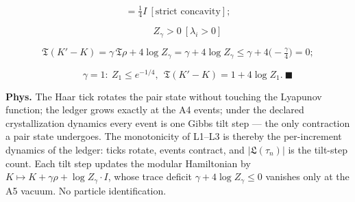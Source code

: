 \begin{corollary}
\[
= \tfrac14I\ [\text{strict concavity}];
\]

\[
\qquad Z_\gamma>0\ [\lambda_i>0]
\]

\[
\mathfrak T(K'-K)=\gamma\,\mathfrak T\rho+4\log Z_\gamma=\gamma+4\log Z_\gamma\le\gamma+4\bigl(-\tfrac\gamma4\bigr)=0;
\]

\[
\qquad \gamma=1:\ Z_1\le e^{-1/4},\ \ \mathfrak T(K'-K)=1+4\log Z_1.\ \blacksquare
\]

\textbf{Phys.} The Haar tick rotates the pair state without touching the Lyapunov function; the ledger grows exactly at the A4 events; under the declared crystallization dynamics every event is one Gibbs tilt step — the only contraction a pair state undergoes. The monotonicity of L1–L3 is thereby the per-increment dynamics of the ledger: ticks rotate, events contract, and $|\mathfrak L(\tau_n)|$ is the tilt-step count. Each tilt step updates the modular Hamiltonian by $K\mapsto K+\gamma\rho+\log Z_\gamma\cdot I$, whose trace deficit $\gamma+4\log Z_\gamma\le0$ vanishes only at the A5 vacuum. No particle identification.

\end{corollary}

